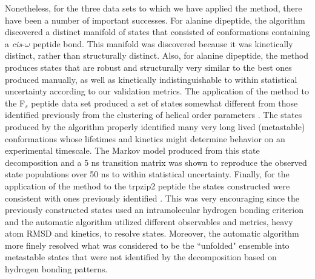 Nonetheless, for the three data sets to which we have applied the method, there have been a number of important successes.  
For alanine dipeptide, the algorithm discovered a distinct manifold of states that consisted of conformations containing a \emph{cis}-$\omega$ peptide bond.
This manifold was discovered because it was kinetically distinct, rather than structurally distinct. 
Also, for alanine dipeptide, the method produces states that are robust and structurally very similar to the best ones produced manually, as well as kinetically indistinguishable to within statistical uncertainty according to our validation metrics.
The application of the method to the F$_s$ peptide data set produced a set of states somewhat different from those identified previously from the clustering of helical order parameters \cite{sorin:2005b}.  
The states produced by the algorithm properly identified many very long lived (metastable) conformations whose lifetimes and kinetics might determine behavior on an experimental timescale.    
The Markov model produced from this state decomposition and a 5 ns transition matrix was shown to reproduce the observed state populations over 50 ns to within statistical uncertainty.
Finally, for the application of the method to the trpzip2 peptide the states constructed were consistent with ones previously identified \cite{pitera:2006a}.  
This was very encouraging since the previously constructed states used an intramolecular hydrogen bonding criterion and the automatic algorithm utilized different observables and metrics, heavy atom RMSD and kinetics, to resolve states.  
Moreover, the automatic algorithm  more finely resolved what was considered to be the ``unfolded" ensemble into metastable states that were not identified by the decomposition based on hydrogen bonding patterns.

